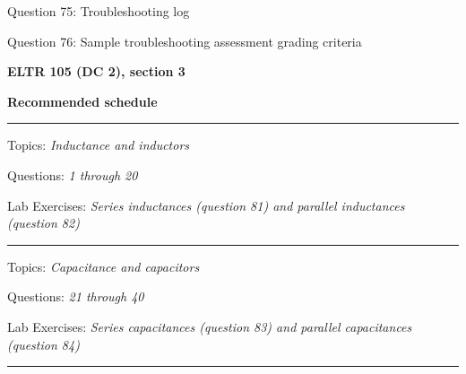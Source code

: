 \hskip 10pt Question 75: Troubleshooting log
 
\hskip 10pt Question 76: Sample troubleshooting assessment grading criteria
 
\vskip 10pt









\vfil \eject

\centerline{\bf ELTR 105 (DC 2), section 3} \bigskip 
 
\vskip 10pt

\noindent
{\bf Recommended schedule}

\vskip 5pt

\hrule \vskip 5pt
\noindent
{}

\hskip 10pt Topics: {\it Inductance and inductors}
 
\hskip 10pt Questions: {\it 1 through 20}
 
\hskip 10pt Lab Exercises: {\it Series inductances (question 81) and parallel inductances (question 82)}
 


\vskip 10pt
\hrule \vskip 5pt
\noindent
{}

\hskip 10pt Topics: {\it Capacitance and capacitors}
 
\hskip 10pt Questions: {\it 21 through 40}
 
\hskip 10pt Lab Exercises: {\it Series capacitances (question 83) and parallel capacitances (question 84)}
 




\vskip 10pt
\hrule \vskip 5pt
\noindent
{}

